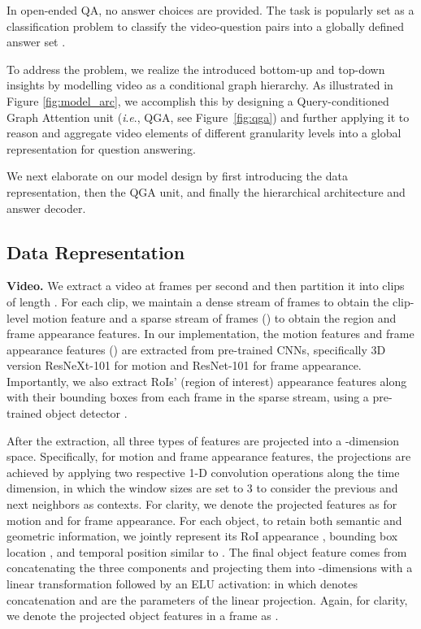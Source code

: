 \documentclass[letterpaper]{article} \usepackage{aaai21}  \usepackage{times}  \usepackage{helvet} \usepackage{courier}  \usepackage[hyphens]{url}  \usepackage{graphicx} \urlstyle{rm} \def\UrlFont{\rm}  \usepackage{natbib}  \usepackage{caption} \usepackage{color, colortbl}
\newcommand{\ie}{\textit{i}.\textit{e}.}
\begin{document}
In open-ended QA, no answer choices are provided. The task is popularly set as a classification problem to classify the video-question pairs into a globally defined answer set .


To address the problem, we realize the introduced bottom-up and top-down insights by modelling video as a conditional graph hierarchy. As illustrated in Figure \ref{fig:model_arc}, we accomplish this by designing a Query-conditioned Graph Attention unit (\ie, QGA, see Figure~\ref{fig:qga}) and further applying it to reason and aggregate video elements of different granularity levels into a global representation for question answering.

We next elaborate on our model design by first introducing the data representation, then the QGA unit, and finally the hierarchical architecture and answer decoder. 

\subsection{Data Representation}
\textbf{Video.}
We extract a video at  frames per second and then partition it into  clips of length . For each clip, we maintain a dense stream of  frames to obtain the clip-level motion feature and a sparse stream of  frames () to obtain the region and frame appearance features. In our implementation, the motion features  and frame appearance features  () are extracted from pre-trained CNNs, specifically 3D version ResNeXt-101 \cite{hara2018can} for motion and ResNet-101 \cite{he2016deep} for frame appearance. Importantly, we also extract  RoIs' (region of interest) appearance features  along with their bounding boxes from each frame in the sparse stream, using a pre-trained object detector \cite{anderson2018bottom}.

After the extraction, all three types of features are projected into a -dimension space. Specifically, for motion and frame appearance features, the projections are achieved by applying two respective 1-D convolution operations along the time dimension, in which the window sizes are set to 3 to consider the previous and next neighbors as contexts. For clarity, we denote the projected features as  for motion and  for frame appearance. For each object, to retain both semantic and geometric information, we jointly represent its RoI appearance , bounding box location , and temporal position  similar to \cite{huang2020location}. The final object feature comes from concatenating the three components and projecting them into -dimensions with a linear transformation followed by an ELU activation:  in which  denotes concatenation and  are the parameters of the linear projection. Again, for clarity, we denote the projected object features in a frame as .
\end{document}
